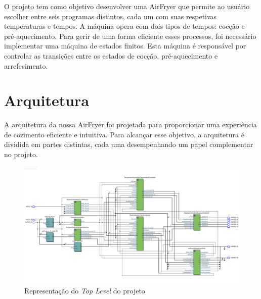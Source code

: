 \documentclass[a4paper, 11pt, onecolumn, oneside]{report}
\begin{document}
O projeto tem como objetivo desenvolver uma AirFryer que permite ao usuário escolher entre seis programas distintos, cada um com suas respetivas temperaturas e tempos. A máquina opera com dois tipos de tempos: cocção e pré-aquecimento. Para gerir de uma forma eficiente esses processos, foi necessário implementar uma máquina de estados finitos. Esta máquina é responsável por controlar as transições entre os estados de cocção, pré-aquecimento e arrefecimento.

\chapter{Arquitetura}
\label{chap.arquitetura}
A arquitetura da nossa AirFryer foi projetada para proporcionar uma experiência de cozimento eficiente e intuitiva. Para alcançar esse objetivo, a arquitetura é dividida em partes distintas, cada uma desempenhando um papel complementar no projeto. \\

\begin{figure}[H]
    \centering
    \includegraphics[width=\textwidth]{images/TopLevel.png}
    \caption{Representação do \textit{Top Level} do projeto}
    \label{fig:toplevel}
\end{figure}
\end{document}
